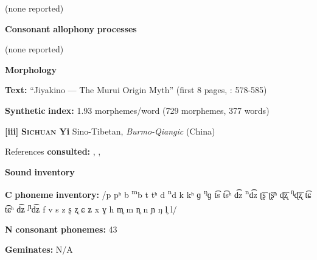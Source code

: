 \documentclass[output=paper]{langsci/langscibook}
\begin{document}
\begin{styleBody}
(none reported)
\end{styleBody}

\begin{styleBody}
\textbf{Consonant} \textbf{allophony} \textbf{processes}
\end{styleBody}

\begin{styleBody}
(none reported)
\end{styleBody}

\begin{styleBody}
\textbf{Morphology}
\end{styleBody}

\begin{styleBody}
\textbf{Text:} “Jiyakino — The Murui Origin Myth” (first 8 pages, \citealt{Wojtylak2017}: 578-585)
\end{styleBody}

\begin{styleBody}
\textbf{Synthetic} \textbf{index:} 1.93 morphemes/word (729 morphemes, 377 words)
\end{styleBody}

\begin{styleBody}
\textbf{[iii]}   \textbf{\textsc{Sichuan} \textbf{Yi}}  Sino-Tibetan, \textit{Burmo-Qiangic} (China)
\end{styleBody}

\begin{styleBody}
References \textbf{consulted:} \citet{Gerner2013}, \citet{Maoji1997}, \citet{Merrifield2012}
\end{styleBody}

\begin{styleBody}
\textbf{Sound} \textbf{inventory}
\end{styleBody}

\begin{styleBody}
\textbf{C} \textbf{phoneme} \textbf{inventory:} /p pʰ b \textsuperscript{m}b t tʰ d \textsuperscript{n}d k kʰ ɡ \textsuperscript{ŋ}ɡ t͡s t͡sʰ d͡z \textsuperscript{n}d͡z ʈ͡ʂ ʈ͡ʂʰ ɖ͡ʐ \textsuperscript{ɳ}ɖ͡ʐ t͡ɕ t͡ɕʰ d͡ʑ \textsuperscript{ɲ}d͡ʑ f v s z ʂ ʐ ɕ ʑ x ɣ h m̥ m n̥ n ɲ ŋ l̥ l/
\end{styleBody}

\begin{styleBody}
\textbf{N} \textbf{consonant} \textbf{phonemes:} 43
\end{styleBody}

\begin{styleBody}
\textbf{Geminates:} N/A
\end{styleBody}
\end{document}
